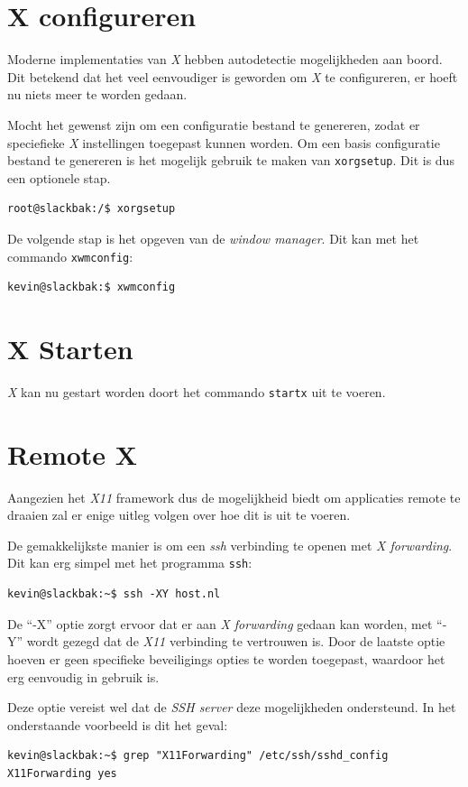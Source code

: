 \section{X configureren}
Moderne implementaties van \emph{X} hebben autodetectie mogelijkheden aan boord. Dit betekend dat het veel eenvoudiger is geworden om \emph{X} te configureren, er hoeft nu niets meer te worden gedaan. 

Mocht het gewenst zijn om een configuratie bestand te genereren, zodat er speciefieke \emph{X} instellingen toegepast kunnen worden. Om een basis configuratie bestand te genereren is het mogelijk gebruik te maken van \texttt{xorgsetup}. Dit is dus een optionele stap.

\begin{lstlisting}
root@slackbak:/$ xorgsetup
\end{lstlisting}%

De volgende stap is het opgeven van de \emph{window manager}. Dit kan met het commando \texttt{xwmconfig}: 

\begin{lstlisting}
kevin@slackbak:$ xwmconfig
\end{lstlisting}%

\section{X Starten}
\emph{X} kan nu gestart worden doort het commando \texttt{startx} uit te voeren. 

\section{Remote X}
Aangezien het \emph{X11} framework dus de mogelijkheid biedt om applicaties remote te draaien zal er enige uitleg volgen over hoe dit is uit te voeren. 

De gemakkelijkste manier is om een \emph{ssh} verbinding te openen met \emph{X forwarding}. Dit kan erg simpel met het programma \texttt{ssh}:
\begin{lstlisting}
kevin@slackbak:~$ ssh -XY host.nl
\end{lstlisting}%
De ``-X'' optie zorgt ervoor dat er aan \emph{X forwarding} gedaan kan worden, met ``-Y'' wordt gezegd dat de \emph{X11} verbinding te vertrouwen is. Door de laatste optie hoeven er geen specifieke beveiligings opties te worden toegepast, waardoor het erg eenvoudig in gebruik is. 

Deze optie vereist wel dat de \emph{SSH server} deze mogelijkheden ondersteund. In het onderstaande voorbeeld is dit het geval:
\begin{lstlisting}
kevin@slackbak:~$ grep "X11Forwarding" /etc/ssh/sshd_config 
X11Forwarding yes
\end{lstlisting}%

